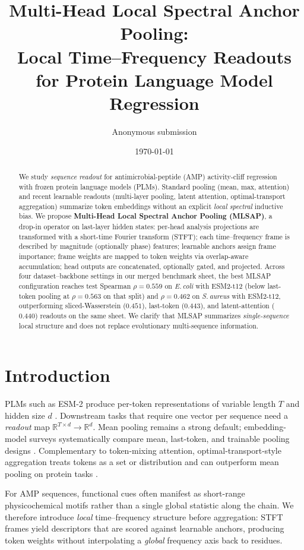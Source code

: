 \documentclass[11pt]{article}
\title{Multi-Head Local Spectral Anchor Pooling:\\
Local Time--Frequency Readouts for Protein Language Model Regression}
\author{Anonymous submission}
\date{\today}
\newcommand{\method}{MLSAP}
\newcommand{\R}{\mathbb{R}}
\begin{document}
\maketitle

\begin{abstract}
We study \emph{sequence readout} for antimicrobial-peptide (AMP) activity-cliff regression with frozen protein language models (PLMs).
Standard pooling (mean, max, attention) and recent learnable readouts (multi-layer pooling, latent attention, optimal-transport aggregation) summarize token embeddings without an explicit \emph{local spectral} inductive bias.
We propose \textbf{Multi-Head Local Spectral Anchor Pooling (\method)}, a drop-in operator on last-layer hidden states: per-head analysis projections are transformed with a short-time Fourier transform (STFT); each time--frequency frame is described by magnitude (optionally phase) features; learnable anchors assign frame importance; frame weights are mapped to token weights via overlap-aware accumulation; head outputs are concatenated, optionally gated, and projected.
Across four dataset--backbone settings in our merged benchmark sheet, the best \method{} configuration reaches test Spearman $\rho=0.559$ on \textit{E.\,coli} with ESM2-t12 (below last-token pooling at $\rho=0.563$ on that split) and $\rho=\mathbf{0.462}$ on \textit{S.\,aureus} with ESM2-t12, outperforming sliced-Wasserstein ($0.451$), last-token ($0.443$), and latent-attention ($0.440$) readouts on the same sheet.
We clarify that \method{} summarizes \emph{single-sequence} local structure and does not replace evolutionary multi-sequence information.
\end{abstract}

\section{Introduction}
PLMs such as ESM-2 produce per-token representations of variable length $T$ and hidden size $d$ \cite{lin2023evolutionary}.
Downstream tasks that require one vector per sequence need a \emph{readout} map $\R^{T\times d}\rightarrow \R^{d}$.
Mean pooling remains a strong default; embedding-model surveys systematically compare mean, last-token, and trainable pooling designs \cite{tang2024poolingattentioneffectivedesigns}.
Complementary to token-mixing attention, optimal-transport-style aggregation treats tokens as a set or distribution and can outperform mean pooling on protein tasks \cite{naderi2024aggregating}.

For AMP sequences, functional cues often manifest as short-range physicochemical motifs rather than a single global statistic along the chain.
We therefore introduce \emph{local} time--frequency structure before aggregation: STFT frames yield descriptors that are scored against learnable anchors, producing token weights without interpolating a \emph{global} frequency axis back to residues.
\end{document}
